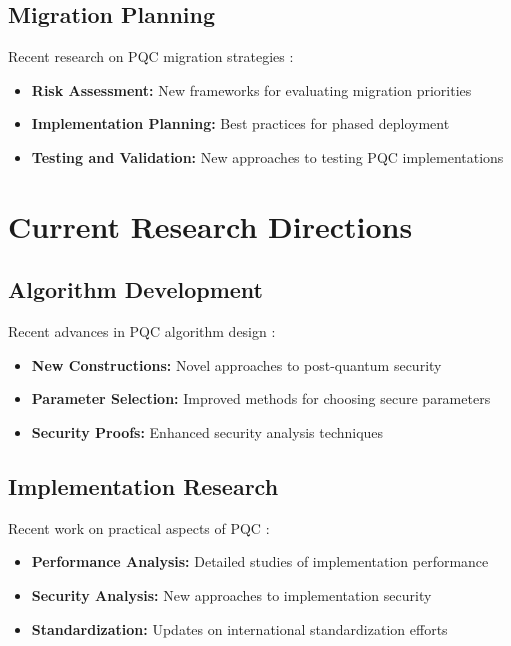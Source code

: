 \subsection{Migration Planning}
Recent research on PQC migration strategies \parencite{pqc_migration_2024}:

\begin{itemize}
    \item \textbf{Risk Assessment:} New frameworks for evaluating migration priorities \parencite{migration_risk_2024}
    \item \textbf{Implementation Planning:} Best practices for phased deployment \parencite{implementation_planning_2024}
    \item \textbf{Testing and Validation:} New approaches to testing PQC implementations \parencite{pqc_testing_2024}
\end{itemize}

\section{Current Research Directions}

\subsection{Algorithm Development}
Recent advances in PQC algorithm design \parencite{pqc_algorithms_2024}:

\begin{itemize}
    \item \textbf{New Constructions:} Novel approaches to post-quantum security \parencite{new_constructions_2024}
    \item \textbf{Parameter Selection:} Improved methods for choosing secure parameters \parencite{parameter_selection_2024}
    \item \textbf{Security Proofs:} Enhanced security analysis techniques \parencite{security_proofs_2024}
\end{itemize}

\subsection{Implementation Research}
Recent work on practical aspects of PQC \parencite{pqc_implementation_2024}:

\begin{itemize}
    \item \textbf{Performance Analysis:} Detailed studies of implementation performance \parencite{performance_analysis_2024}
    \item \textbf{Security Analysis:} New approaches to implementation security \parencite{implementation_analysis_2024}
    \item \textbf{Standardization:} Updates on international standardization efforts \parencite{standardization_2024}
\end{itemize}

